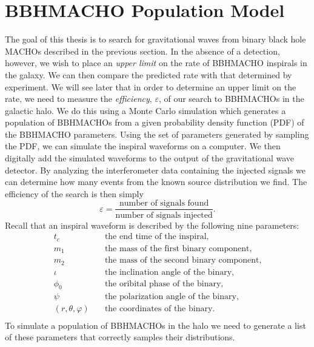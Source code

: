 \section{BBHMACHO Population Model}
\label{s:bbhmachopopulation}

The goal of this thesis is to search for gravitational waves from binary
black hole MACHOs described in the previous section. In the absence of a
detection, however, we wish to place an \emph{upper limit} on the rate of
BBHMACHO inspirals in the galaxy. We can then compare the predicted rate
with that determined by experiment. We will see later that in order to
determine an upper limit on the rate, we need to measure the \emph{efficiency},
$\varepsilon$, of our search to BBHMACHOs in the galactic halo. We do this
using a Monte Carlo simulation which generates a population of BBHMACHOs from
a given probability density function (PDF) of the BBHMACHO parameters. Using the
set of parameters generated by sampling the PDF, we can simulate the inspiral
waveforms on a computer. We then digitally add the simulated waveforms to the
output of the gravitational wave detector. By analyzing
the interferometer data containing the injected signals we can determine how
many events from the known source distribution we find. The efficiency of the
search is then simply
\begin{equation}
\varepsilon = 
\frac{\textrm{number of signals found}}{\textrm{number of signals injected}}.
\end{equation}
Recall that an inspiral waveform is described by the following nine 
parameters:
\begin{equation*}
\begin{split}
t_c &\quad \textrm{the end time of the inspiral}, \\
m_1 &\quad \textrm{the mass of the first binary component}, \\
m_2 &\quad \textrm{the mass of the second binary component}, \\
\iota &\quad \textrm{the inclination angle of the binary}, \\
\phi_0 &\quad \textrm{the oribital phase of the binary}, \\
\psi &\quad \textrm{the polarization angle of the binary}, \\
(r,\theta,\varphi) &\quad \textrm{the coordinates of the binary}.\\
\end{split}
\end{equation*}
To simulate a population of BBHMACHOs in the halo we need to generate a list
of these parameters that correctly samples their distributions.

